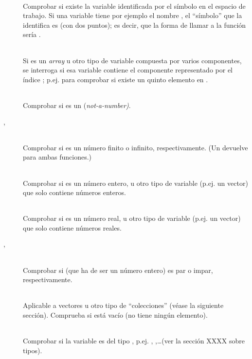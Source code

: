 \begin{description}
  \item[] \hfill \\
  Comprobar si existe la variable identificada por el símbolo  en el espacio de trabajo. Si una variable tiene por ejemplo el nombre , el ``símbolo'' que la identifica es  (con dos puntos); es decir, que la forma de llamar a la función sería .
  \item[] \hfill \\
  Si  es un \emph{array} u otro tipo de variable compuesta por varios componentes, se interroga si esa variable contiene el componente representado por el índice ; p.ej.  para comprobar si existe un quinto elemento en .
  \item[] \hfill \\
  Comprobar si  es un  (\emph{not-a-number)}.
  \item[, ] \hfill \\
  Comprobar si  es un número finito o infinito, respectivamente. (Un  devuelve  para ambas funciones.)
  \item[] \hfill \\
  Comprobar si  es un número entero, u otro tipo de variable (p.ej. un vector) que solo contiene números enteros.
  \item[] \hfill \\
  Comprobar si  es un número real, u otro tipo de variable (p.ej. un vector) que solo contiene números reales.
  \item[, ] \hfill \\
  Comprobar si  (que ha de ser un número entero) es par o impar, respectivamente.
  \item[] \hfill \\
  Aplicable a vectores u otro tipo de ``colecciones'' (véase la siguiente sección). Comprueba si  está vacío (no tiene ningún elemento).
  \item[] \hfill \\
  Comprobar si la variable  es del tipo , p.ej. , ,\ldots (ver la sección XXXX sobre tipos).
  \item[] \hfill \\

\end{description}
